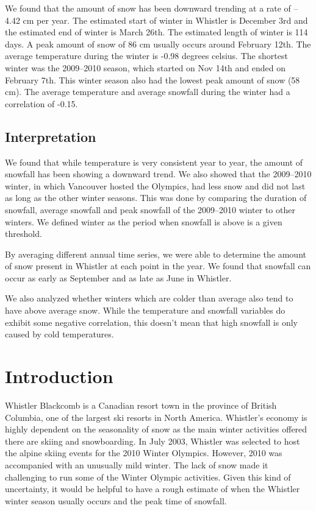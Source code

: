\documentclass[12pt,twoside]{article}
\begin{document}
{We found that the amount of snow has been downward trending at a rate of -- 4.42 cm per year. The estimated start of winter in Whistler is December 3rd and the estimated end of winter is March 26th. The estimated length of winter is 114 days. A peak amount of snow of 86 cm usually occurs around February 12th. The average temperature during the winter is -0.98 degrees celsius. The shortest winter was the 2009--2010 season, which started on Nov 14th and ended on February 7th. This winter season also had the lowest peak amount of snow (58 cm). The average temperature and average snowfall during the winter had a correlation of -0.15.

\subsection{Interpretation}

We found that while temperature is very consistent year to year, the amount of snowfall has been showing a downward trend. We also showed that the 2009--2010 winter, in which Vancouver hosted the Olympics, had less snow and did not last as long as the other winter seasons. This was done by comparing the duration of snowfall, average snowfall and peak snowfall of the 2009--2010 winter to other winters. We defined winter as the period when snowfall is above is a given threshold.

By averaging different annual time series, we were able to determine the amount of snow present in Whistler at each point in the year. We found that snowfall can occur as early as September and as late as June in Whistler.

We also analyzed whether winters which are colder than average also tend to have above average snow. While the temperature and snowfall variables do exhibit some negative correlation, this doesn't mean that high snowfall is only caused by cold temperatures.

\section{Introduction}

Whistler Blackcomb is a Canadian resort town in the province of British Columbia, one of the largest ski resorts in North America. Whistler’s economy is highly dependent on the seasonality of snow as the main winter activities offered there are skiing and snowboarding. In July 2003, Whistler was selected to host the alpine skiing events for the 2010 Winter Olympics. However, 2010 was accompanied with an unusually mild winter. The lack of snow made it challenging to run some of the Winter Olympic activities. Given this kind of uncertainty, it would be helpful to have a rough estimate of when the Whistler winter season usually occurs and the peak time of snowfall.

}
\end{document}
